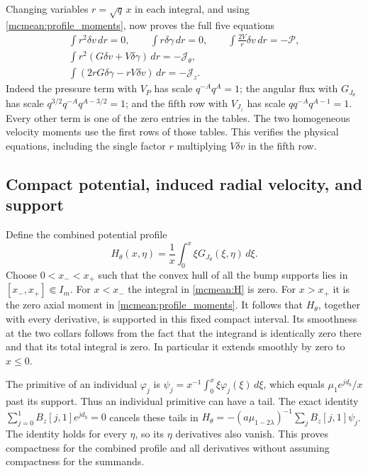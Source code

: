 \documentclass[11pt]{article}
\begin{document}
Changing variables \(r=\sqrt q\,x\) in each integral, and using
\eqref{mcmean:profile_moments}, now proves the full five equations
\begin{equation}\label{mcmean:five_rows}
\begin{gathered}
 \int r^2\delta v\,dr=0,\qquad
 \int r\delta\gamma\,dr=0,\qquad
 \int\frac{2V}{r}\delta v\,dr=-\mathcal P,\\
 \int r^2(G\delta v+V\delta\gamma)\,dr=-\mathcal J_\theta,\\
 \int(2rG\delta\gamma-rV\delta v)\,dr=-\mathcal J_z.
\end{gathered}
\end{equation}
Indeed the pressure term with \(V_P\) has scale
\(q^{-A}q^A=1\); the angular flux with \(G_{J_\theta}\) has scale
\(q^{3/2}q^{-A}q^{A-3/2}=1\); and the fifth row with
\(V_{J_z}\) has scale \(q q^{-A}q^{A-1}=1\).
Every other term is one of the zero entries in the tables. The two
homogeneous velocity moments use the first rows of those tables.
This verifies the physical equations, including the single factor
\(r\) multiplying \(V\delta v\) in the fifth row.

\subsection{Compact potential, induced radial velocity, and support}

Define the combined potential profile
\begin{equation}\label{mcmean:H}
 H_\theta(x,\eta)=\frac1x\int_0^x\xi G_{J_\theta}(\xi,\eta)\,d\xi.
\end{equation}
Choose \(0<x_-<x_+\) such that the convex hull of all the bump
supports lies in \([x_-,x_+]\Subset I_m\). For \(x<x_-\) the
integral in \eqref{mcmean:H} is zero. For \(x>x_+\) it is the
zero axial moment in \eqref{mcmean:profile_moments}.
It follows that \(H_\theta\), together with every derivative, is
supported in this fixed compact interval. Its smoothness at the two
collars follows from the fact that the integrand is identically zero
there and that its total integral is zero. In particular it extends
smoothly by zero to \(x\le0\).

The primitive of an individual \(\varphi_j\) is
\(\psi_j=x^{-1}\int_0^x\xi\varphi_j(\xi)\,d\xi\), which equals
\(\mu_1e^{jd_b}/x\) past its support. Thus an individual primitive
can have a tail. The exact identity
\(\sum_{j=0}^1 B_z[j,1]e^{jd_b}=0\) cancels these tails in
\(H_\theta=-(a\mu_{1-2\lambda})^{-1}\sum_j B_z[j,1]\psi_j\).
The identity holds for every \(\eta\), so its \(\eta\) derivatives
also vanish. This proves compactness for the combined profile and
all derivatives without assuming compactness for the summands.
\end{document}
